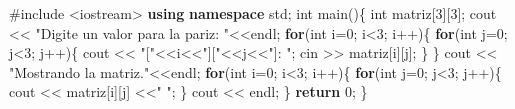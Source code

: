 \documentclass[
  11pt,
  a4paper,
  DIV=11,
  numbers=noendperiod]{scrreprt}
\newenvironment{Shaded}{\begin{snugshade}}{\end{snugshade}}
\newcommand{\ControlFlowTok}[1]{\textcolor[rgb]{0.00,0.23,0.31}{\textbf{#1}}}
\newcommand{\DataTypeTok}[1]{\textcolor[rgb]{0.68,0.00,0.00}{#1}}
\newcommand{\DecValTok}[1]{\textcolor[rgb]{0.68,0.00,0.00}{#1}}
\newcommand{\ImportTok}[1]{\textcolor[rgb]{0.00,0.46,0.62}{#1}}
\newcommand{\KeywordTok}[1]{\textcolor[rgb]{0.00,0.23,0.31}{\textbf{#1}}}
\newcommand{\NormalTok}[1]{\textcolor[rgb]{0.00,0.23,0.31}{#1}}
\newcommand{\OperatorTok}[1]{\textcolor[rgb]{0.37,0.37,0.37}{#1}}
\newcommand{\PreprocessorTok}[1]{\textcolor[rgb]{0.68,0.00,0.00}{#1}}
\newcommand{\StringTok}[1]{\textcolor[rgb]{0.13,0.47,0.30}{#1}}
\begin{document}
\begin{Shaded}
\begin{Highlighting}[]
\PreprocessorTok{\#include }\ImportTok{\textless{}iostream\textgreater{}}
\KeywordTok{using} \KeywordTok{namespace}\NormalTok{ std}\OperatorTok{;}
\DataTypeTok{int}\NormalTok{ main}\OperatorTok{()\{}
    \DataTypeTok{int}\NormalTok{ matriz}\OperatorTok{[}\DecValTok{3}\OperatorTok{][}\DecValTok{3}\OperatorTok{];}
\NormalTok{    cout }\OperatorTok{\textless{}\textless{}} \StringTok{"Digite un valor para la pariz: "}\OperatorTok{\textless{}\textless{}}\NormalTok{endl}\OperatorTok{;}
    \ControlFlowTok{for}\OperatorTok{(}\DataTypeTok{int}\NormalTok{ i}\OperatorTok{=}\DecValTok{0}\OperatorTok{;}\NormalTok{ i}\OperatorTok{\textless{}}\DecValTok{3}\OperatorTok{;}\NormalTok{ i}\OperatorTok{++)\{}
        \ControlFlowTok{for}\OperatorTok{(}\DataTypeTok{int}\NormalTok{ j}\OperatorTok{=}\DecValTok{0}\OperatorTok{;}\NormalTok{ j}\OperatorTok{\textless{}}\DecValTok{3}\OperatorTok{;}\NormalTok{ j}\OperatorTok{++)\{}
\NormalTok{            cout }\OperatorTok{\textless{}\textless{}} \StringTok{"["}\OperatorTok{\textless{}\textless{}}\NormalTok{i}\OperatorTok{\textless{}\textless{}}\StringTok{"]["}\OperatorTok{\textless{}\textless{}}\NormalTok{j}\OperatorTok{\textless{}\textless{}}\StringTok{"]: "}\OperatorTok{;}
\NormalTok{            cin }\OperatorTok{\textgreater{}\textgreater{}}\NormalTok{ matriz}\OperatorTok{[}\NormalTok{i}\OperatorTok{][}\NormalTok{j}\OperatorTok{];}
        \OperatorTok{\}}
    \OperatorTok{\}}
\NormalTok{    cout }\OperatorTok{\textless{}\textless{}} \StringTok{"Mostrando la matriz."}\OperatorTok{\textless{}\textless{}}\NormalTok{endl}\OperatorTok{;}
    \ControlFlowTok{for}\OperatorTok{(}\DataTypeTok{int}\NormalTok{ i}\OperatorTok{=}\DecValTok{0}\OperatorTok{;}\NormalTok{ i}\OperatorTok{\textless{}}\DecValTok{3}\OperatorTok{;}\NormalTok{ i}\OperatorTok{++)\{}
        \ControlFlowTok{for}\OperatorTok{(}\DataTypeTok{int}\NormalTok{ j}\OperatorTok{=}\DecValTok{0}\OperatorTok{;}\NormalTok{ j}\OperatorTok{\textless{}}\DecValTok{3}\OperatorTok{;}\NormalTok{ j}\OperatorTok{++)\{}
\NormalTok{            cout }\OperatorTok{\textless{}\textless{}}\NormalTok{ matriz}\OperatorTok{[}\NormalTok{i}\OperatorTok{][}\NormalTok{j}\OperatorTok{]} \OperatorTok{\textless{}\textless{}}\StringTok{" "}\OperatorTok{;}
        \OperatorTok{\}}
\NormalTok{        cout }\OperatorTok{\textless{}\textless{}}\NormalTok{ endl}\OperatorTok{;}
    \OperatorTok{\}}
    \ControlFlowTok{return} \DecValTok{0}\OperatorTok{;}
\OperatorTok{\}}
\end{Highlighting}
\end{Shaded}
\end{document}
